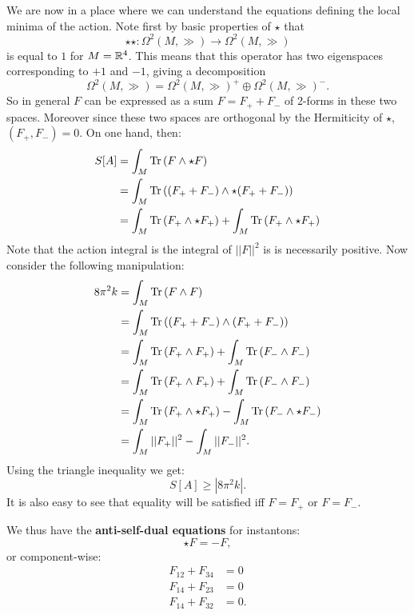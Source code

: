 	We are now in a place where we can understand the equations defining the local minima of the action. Note first by basic properties of $\star$ that
	\begin{equation}
		\star \star: \Omega^2(M, \gg) \to \Omega^2(M, \gg)
	\end{equation}
	is equal to $1$ for $M = \mathbb{R}^4$. This means that this operator has two eigenspaces corresponding to $+1$ and $-1$, giving a decomposition
	\begin{equation}
		\Omega^2(M, \gg) = \Omega^2(M, \gg)^+ \oplus \Omega^2(M, \gg)^-.
	\end{equation}
	So in general $F$ can be expressed as a sum $F = F_+ + F_-$ of 2-forms in these two spaces. Moreover since these two spaces are orthogonal by the Hermiticity of $\star$, $(F_+, F_-) = 0$. On one hand, then:
	\[
	\begin{aligned}
		S[A] &= \int_M \mathrm{Tr}\,(F \wedge \star F)\\
			 &= \int_M \mathrm{Tr}\,((F_+ + F_-) \wedge \star(F_+ + F_-))\\
			 &= \int_M \mathrm{Tr}\,(F_+ \wedge \star F_+) + \int_M \mathrm{Tr}\,(F_+ \wedge \star F_+)\\
	\end{aligned}
	\]
	Note that the action integral is the integral of $||F||^2$ is is necessarily positive. Now consider the following manipulation:
	\[
	\begin{aligned}
		8\pi^2 k &= \int_M \mathrm{Tr}\,(F \wedge F) \\
		  &= \int_M \mathrm{Tr}\,((F_+ + F_-)\wedge (F_+ + F_-)) \\
		  &= \int_M \mathrm{Tr}\,(F_+ \wedge F_+) + \int_M \mathrm{Tr}\,(F_- \wedge F_-) \\
		  &= \int_M \mathrm{Tr}\,(F_+ \wedge F_+) + \int_M \mathrm{Tr}\,(F_- \wedge F_-) \\
		  &= \int_M \mathrm{Tr}\,(F_+ \wedge \star F_+) - \int_M \mathrm{Tr}\,(F_- \wedge \star F_-)\\
		  &= \int_M ||F_+||^2 - \int_M ||F_-||^2.
	\end{aligned}
	\]
	Using the triangle inequality we get:
	\begin{equation}
		S[A] \geq |8 \pi^2 k|.
	\end{equation}
	It is also easy to see that equality will be satisfied iff $F = F_+$ or $F=F_-$.
	
	We thus have the \textbf{anti-self-dual equations} for instantons:
	\begin{equation}\label{eq:asd1}
		\star F = - F,
	\end{equation}
	or component-wise:
	\begin{equation}
		\begin{aligned}
			F_{12} + F_{34} &= 0\\
			F_{14} + F_{23} &= 0\\
			F_{14} + F_{32} &= 0.
		\end{aligned}
	\end{equation}
	

